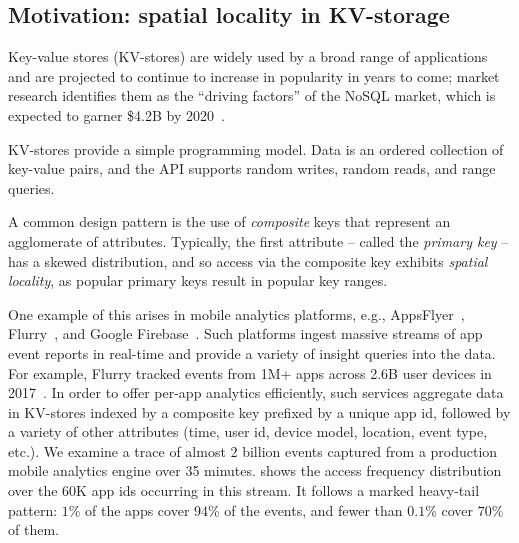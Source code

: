 \subsection{Motivation:  spatial locality in KV-storage}

Key-value stores (KV-stores) are widely used  by a broad range of applications and are projected
to continue to increase in popularity in years to come; market research  identifies them as the 
``driving factors'' of the NoSQL market, which is expected to garner \$4.2B by 2020~\cite{alliedmarketresearch}.

KV-stores provide a simple programming model. 
Data is an ordered collection of key-value pairs, and the API supports random writes, 
random reads, and range queries. 

A common design pattern is the use of \emph{composite} keys that represent an agglomerate of attributes.
Typically, the first attribute -- called the \emph{primary key} -- has a skewed distribution, and so   access via the composite key exhibits \emph{spatial locality}, as 
popular primary keys result in popular key ranges. 

One example of this arises in mobile analytics platforms, e.g., AppsFlyer~\cite{appsflyer}, Flurry~\cite{flurry}, 
and Google Firebase~\cite{firebase}. %
Such platforms %
ingest massive streams of app event reports %
in  real-time and provide a variety of insight queries into the data. For example, Flurry tracked events from  
1M+ apps across 2.6B user devices  in 2017~\cite{FlurryReport2017}. In order to offer per-app analytics efficiently,
such services aggregate data in KV-stores indexed by a composite key prefixed by a unique app 
id,  followed by a variety of other attributes (time, user id, device model, location, event type, etc.).
%
We examine a trace of almost $2$ billion events captured from a production mobile analytics engine over 35 minutes.  
 shows the access frequency distribution over the  $60$K app ids occurring in this stream. It follows a marked
heavy-tail pattern: 
$1$\% of the apps  cover $94$\% of the events, and fewer 
than $0.1$\% cover $70$\% of them. 

